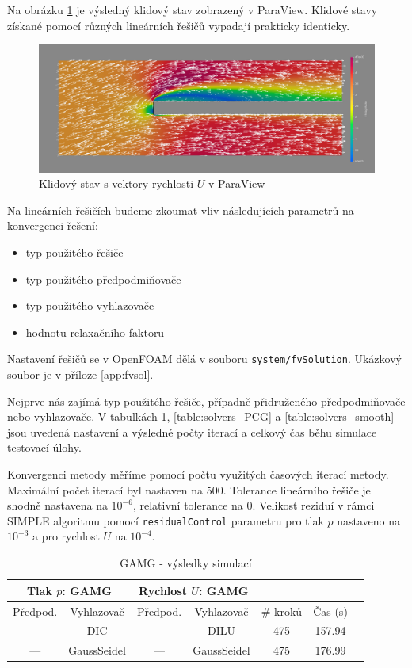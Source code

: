 \documentclass[a4paper,12pt]{report}
\theoremstyle{remark}
\begin{document}
Na obrázku \ref{fig:pv-GAMG-GS} je výsledný klidový stav zobrazený v ParaView. Klidové stavy získané pomocí různých lineárních řešičů vypadají prakticky identicky.	
	 \begin{figure}[H]
		\centering
		\includegraphics[width=1\linewidth]{pv-GAMG-GS.png}
		\caption{Klidový stav s vektory rychlosti $U$ v ParaView}
		\label{fig:pv-GAMG-GS}
	\end{figure}
Na lineárních řešičích budeme zkoumat vliv následujících parametrů na konvergenci řešení:
 \begin{itemize}
	\item typ použitého řešiče
	\item typ použitého předpodmiňovače
	\item typ použitého vyhlazovače
	\item hodnotu relaxačního faktoru
\end{itemize}
Nastavení řešičů se v OpenFOAM dělá v souboru \texttt{system/fvSolution}. Ukázkový soubor je v příloze \ref{app:fvsol}.
	
 Nejprve nás zajímá typ použitého řešiče, případně přidruženého předpodmiňovače nebo vyhlazovače. V tabulkách \ref{table:solvers_GAMG}, \ref{table:solvers_PCG} a \ref{table:solvers_smooth} jsou uvedená nastavení a výsledné počty iterací a celkový čas běhu simulace testovací úlohy.
 
 Konvergenci metody měříme pomocí počtu využitých časových iterací metody. Maximální počet iterací byl nastaven na $500$. Tolerance lineárního řešiče je shodně nastavena na $10^{-6}$, relativní tolerance na $0$. Velikost reziduí v rámci SIMPLE algoritmu pomocí \texttt{residualControl} parametru pro tlak $p$ nastaveno na $10^{-3}$ a pro rychlost $U$ na $10^{-4}$.

 \begin{table}[H]
	\centering
	\caption{GAMG - výsledky simulací}
	\renewcommand{\arraystretch}{1.9}
	\begin{tabular}{*7c}
		\toprule
		\multicolumn{2}{c}{Tlak $p$: \textbf{GAMG}} & \multicolumn{2}{c}{Rychlost $U$: \textbf{GAMG}}\\		
		\midrule
		Předpod.&Vyhlazovač&Předpod.&Vyhlazovač&\# kroků&Čas (s)\\
		\midrule
		 --- & DIC & --- &  DILU & 475 &157.94\\		
		 --- & GaussSeidel &  --- & GaussSeidel & 475&176.99\\
		\bottomrule
\end{tabular}
\label{table:solvers_GAMG}
\end{table}
\end{document}
